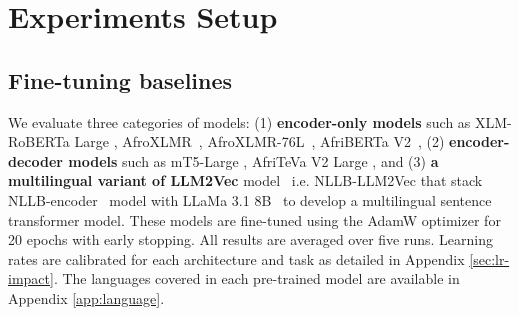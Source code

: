 \section{Experiments Setup}

\subsection{Fine-tuning baselines}
We evaluate three categories of models: (1) \textbf{encoder-only models} such as XLM-RoBERTa Large \cite{XLM-R}, AfroXLMR~\cite{AfroXLM}, AfroXLMR-76L~\cite{AfroXLM-76L}, AfriBERTa V2~\cite{oladipo2024scaling}, (2)  \textbf{encoder-decoder models} such as mT5-Large \cite{mT5}, AfriTeVa V2 Large \cite{AfriTeVaV2}, and (3)  \textbf{a multilingual variant of LLM2Vec} model~\citep{llm2vec} i.e. NLLB-LLM2Vec \cite{NLLB-LLM2Vec} that stack NLLB-encoder~\citep{NLLB} model with LLaMa 3.1 8B~\citep{Llama3} to develop a multilingual sentence transformer model. These models are fine-tuned using the AdamW optimizer for 20 epochs with early stopping. All results are averaged over five runs. Learning rates are calibrated for each architecture and task as detailed in Appendix \ref{sec:lr-impact}. The languages covered in each pre-trained model are available in Appendix \ref{app:language}. 

